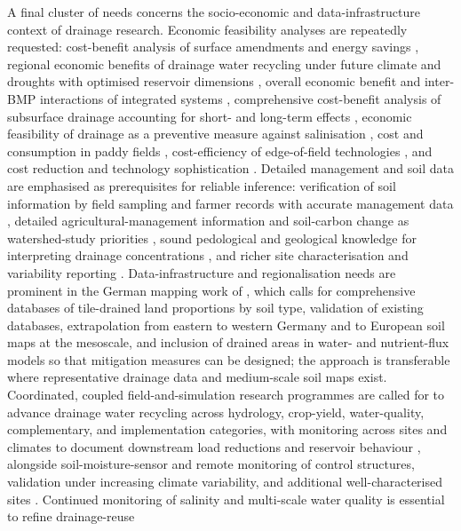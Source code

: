 \documentclass[11pt]{article}
\begin{document}
A final cluster of needs concerns the socio-economic and data-infrastructure
context of drainage research. Economic feasibility analyses are repeatedly
requested: cost-benefit analysis of surface amendments and energy savings
\parencite{Wamono2016b}, regional economic benefits of drainage water recycling
under future climate and droughts with optimised reservoir dimensions
\parencite{Kosari2024}, overall economic benefit and inter-BMP interactions of
integrated systems \parencite{Li2021b}, comprehensive cost-benefit analysis of
subsurface drainage accounting for short- and long-term effects
\parencite{Guo2025}, economic feasibility of drainage as a preventive measure
against salinisation \parencite{Datta2000,HalbacCotoaraZamfir2022}, cost and
consumption in paddy fields \parencite{Jia2023}, cost-efficiency of edge-of-field
technologies \parencite{Mendes2020}, and cost reduction and technology
sophistication \parencite{Okuda2020}. Detailed management and soil data are
emphasised as prerequisites for reliable inference: verification of soil
information by field sampling and farmer records with accurate management data
\parencite{JORJANI1991}, detailed agricultural-management information and soil-carbon
change as watershed-study priorities \parencite{Williams2017}, sound pedological
and geological knowledge for interpreting drainage concentrations
\parencite{Jacobsen2007}, and richer site characterisation and variability
reporting \parencite{Singh2022b}. Data-infrastructure and regionalisation needs are
prominent in the German mapping work of \textcite{Hirt2005,Hirt2005b,Hirt2011},
which calls for comprehensive databases of tile-drained land proportions by soil
type, validation of existing databases, extrapolation from eastern to western
Germany and to European soil maps at the mesoscale, and inclusion of drained areas
in water- and nutrient-flux models so that mitigation measures can be designed; the
approach is transferable where representative drainage data and medium-scale soil
maps exist. Coordinated, coupled field-and-simulation research programmes are
called for to advance drainage water recycling across hydrology, crop-yield,
water-quality, complementary, and implementation categories, with monitoring across
sites and climates to document downstream load reductions and reservoir behaviour
\parencite{Hay2021}, alongside soil-moisture-sensor and remote monitoring of
control structures, validation under increasing climate variability, and
additional well-characterised sites \parencite{Willison2021}. Continued monitoring
of salinity and multi-scale water quality is essential to refine drainage-reuse
\end{document}
